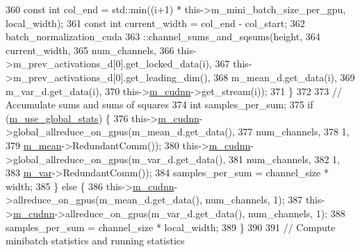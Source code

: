 \begin{DoxyCode}
360         \textcolor{keyword}{const} \textcolor{keywordtype}{int} col\_end = std::min((i+1) * this->m\_mini\_batch\_size\_per\_gpu, local\_width);
361         \textcolor{keyword}{const} \textcolor{keywordtype}{int} current\_width = col\_end - col\_start;
362         batch\_normalization\_cuda
363           ::channel\_sums\_and\_sqsums(height,
364                                     current\_width,
365                                     num\_channels,
366                                     this->m\_prev\_activations\_d[0].get\_locked\_data(i),
367                                     this->m\_prev\_activations\_d[0].get\_leading\_dim(),
368                                     m\_mean\_d.get\_data(i),
369                                     m\_var\_d.get\_data(i),
370                                     this->\hyperlink{classlbann_1_1Layer_a08dbb94239e3b8c96329786c57c72e21}{m\_cudnn}->get\_stream(i));
371       \}
372 
373       \textcolor{comment}{// Accumulate sums and sums of squares}
374       \textcolor{keywordtype}{int} samples\_per\_sum;
375       \textcolor{keywordflow}{if} (\hyperlink{classlbann_1_1batch__normalization_a0a33289150c01899f4b7ef2980771899}{m\_use\_global\_stats}) \{
376         this->\hyperlink{classlbann_1_1Layer_a08dbb94239e3b8c96329786c57c72e21}{m\_cudnn}->global\_allreduce\_on\_gpus(m\_mean\_d.get\_data(),
377                                                 num\_channels,
378                                                 1,
379                                                 \hyperlink{classlbann_1_1batch__normalization_a7c0db2315a4c5bb662da7a740ae76e24}{m\_mean}->RedundantComm());
380         this->\hyperlink{classlbann_1_1Layer_a08dbb94239e3b8c96329786c57c72e21}{m\_cudnn}->global\_allreduce\_on\_gpus(m\_var\_d.get\_data(),
381                                                 num\_channels,
382                                                 1,
383                                                 \hyperlink{classlbann_1_1batch__normalization_aba533149e4179378ab23443b0a2a7dc6}{m\_var}->RedundantComm());
384         samples\_per\_sum = channel\_size * width;
385       \} \textcolor{keywordflow}{else} \{
386         this->\hyperlink{classlbann_1_1Layer_a08dbb94239e3b8c96329786c57c72e21}{m\_cudnn}->allreduce\_on\_gpus(m\_mean\_d.get\_data(), num\_channels, 1);
387         this->\hyperlink{classlbann_1_1Layer_a08dbb94239e3b8c96329786c57c72e21}{m\_cudnn}->allreduce\_on\_gpus(m\_var\_d.get\_data(), num\_channels, 1);
388         samples\_per\_sum = channel\_size * local\_width;
389       \}
390 
391       \textcolor{comment}{// Compute minibatch statistics and running statistics}

\end{DoxyCode}
